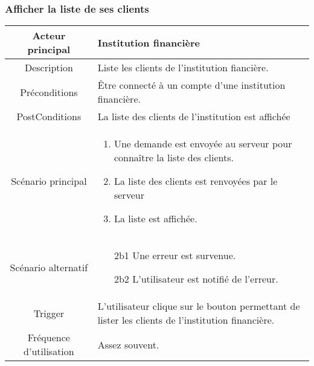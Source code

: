 \documentclass{article}
\begin{document}
\subsubsection{Afficher la liste de ses clients}
\begin{table}[h]
   \begin{tabular}{|c|p{10cm}|}
      \hline
      Acteur principal&Institution financière\\
      \hline
      Description&Liste les clients de l'institution fiancière.\\
      \hline
      Préconditions&Être connecté à un compte d'une institution financière.\\
      \hline
      PostConditions&La liste des clients de l'institution est affichée\\
      \hline
      Scénario principal& 
            \begin{enumerate}
               \item Une demande est envoyée au serveur pour connaître la liste des clients.
               \item La liste des clients est renvoyées par le serveur
               \item La liste est affichée.
            \end{enumerate}     \\
      \hline
      Scénario alternatif&
            \begin{itemize}
               \item[2b1] Une erreur est survenue.
               \item[2b2] L'utilisateur est notifié de l'erreur.  
            \end{itemize}      \\
      \hline
      Trigger&L'utilisateur clique sur le bouton permettant de lister les clients de l'institution financière.\\
      \hline
      Fréquence d'utilisation&Assez souvent.\\
      \hline
   \end{tabular}
\end{table}

\newpage
\end{document}
